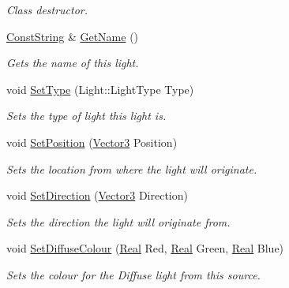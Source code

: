 \begin{DoxyCompactItemize}
\begin{DoxyCompactList}\small\item\em Class destructor. \item\end{DoxyCompactList}\item 
\hyperlink{namespacephys_a5ce5049f8b4bf88d6413c47b504ebb31}{ConstString} \& \hyperlink{classphys_1_1Light_a70f84fef8451b7d489c21476fa90d9df}{GetName} ()
\begin{DoxyCompactList}\small\item\em Gets the name of this light. \item\end{DoxyCompactList}\item 
void \hyperlink{classphys_1_1Light_a87fced0afb0fd44d333c499d41e8568a}{SetType} (Light::LightType Type)
\begin{DoxyCompactList}\small\item\em Sets the type of light this light is. \item\end{DoxyCompactList}\item 
void \hyperlink{classphys_1_1Light_a9c2fcbd1f46ccac815ca7f1b00585c13}{SetPosition} (\hyperlink{classphys_1_1Vector3}{Vector3} Position)
\begin{DoxyCompactList}\small\item\em Sets the location from where the light will originate. \item\end{DoxyCompactList}\item 
void \hyperlink{classphys_1_1Light_a7020d242add6fe47939b3efb3b207f71}{SetDirection} (\hyperlink{classphys_1_1Vector3}{Vector3} Direction)
\begin{DoxyCompactList}\small\item\em Sets the direction the light will originate from. \item\end{DoxyCompactList}\item 
void \hyperlink{classphys_1_1Light_aa54aed6085b348631daa26bc820bb715}{SetDiffuseColour} (\hyperlink{namespacephys_af7eb897198d265b8e868f45240230d5f}{Real} Red, \hyperlink{namespacephys_af7eb897198d265b8e868f45240230d5f}{Real} Green, \hyperlink{namespacephys_af7eb897198d265b8e868f45240230d5f}{Real} Blue)
\begin{DoxyCompactList}\small\item\em Sets the colour for the Diffuse light from this source. \item\end{DoxyCompactList}\item 

\end{DoxyCompactItemize}
